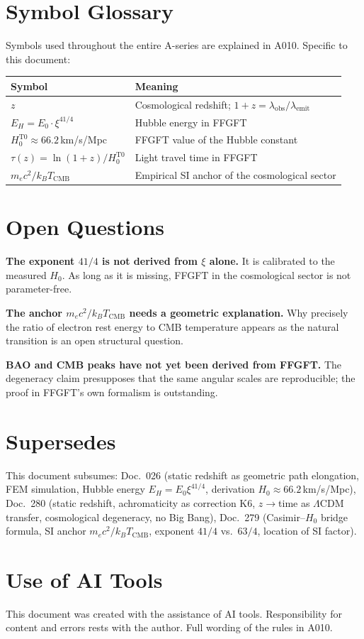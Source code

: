 \section{Symbol Glossary}

Symbols used throughout the entire A-series are explained in A010.
Specific to this document:

\begin{center}
\renewcommand{\arraystretch}{1.3}
{\small\begin{tabular}{lp{9cm}}
\toprule
Symbol & Meaning \\
\midrule
$z$ & Cosmological redshift; $1+z=\lambda_\text{obs}/\lambda_\text{emit}$ \\
$E_H = E_0\cdot\xi^{41/4}$ & Hubble energy in FFGFT \\
$H_0^\text{T0}\approx66{.}2\,$km/s/Mpc & FFGFT value of the Hubble constant \\
$\tau(z) = \ln(1+z)/H_0^\text{T0}$ & Light travel time in FFGFT \\
$m_ec^2/k_BT_\text{CMB}$ & Empirical SI anchor of the cosmological sector \\
\bottomrule
\end{tabular}}
\renewcommand{\arraystretch}{1.0}
\end{center}

\section{Open Questions}

\textbf{The exponent $41/4$ is not derived from $\xi$ alone.} It is calibrated to
the measured $H_0$. As long as it is missing, FFGFT in the cosmological sector is
not parameter-free.

\textbf{The anchor $m_ec^2/k_BT_\text{CMB}$ needs a geometric explanation.} Why
precisely the ratio of electron rest energy to CMB temperature appears as the
natural transition is an open structural question.

\textbf{BAO and CMB peaks have not yet been derived from FFGFT.} The degeneracy
claim presupposes that the same angular scales are reproducible; the proof in
FFGFT's own formalism is outstanding.

\section{Supersedes}

This document subsumes: Doc.~026 (static redshift as geometric path elongation,
FEM simulation, Hubble energy $E_H=E_0\xi^{41/4}$, derivation
$H_0\approx66{.}2\,$km/s/Mpc), Doc.~280 (static redshift, achromaticity as
correction K6, $z\to$time as $\Lambda$CDM transfer, cosmological degeneracy,
no Big Bang), Doc.~279 (Casimir--$H_0$ bridge formula, SI anchor
$m_ec^2/k_BT_\text{CMB}$, exponent $41/4$ vs.\ $63/4$, location of SI factor).

\section{Use of AI Tools}

This document was created with the assistance of AI tools. Responsibility
for content and errors rests with the author. Full wording of the rules in A010.
